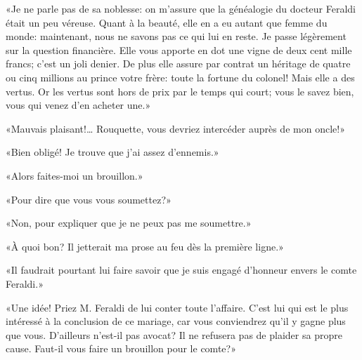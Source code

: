«Je ne parle pas de sa noblesse: on m'assure que la généalogie du docteur Feraldi était un peu véreuse. Quant à la beauté, elle en a eu autant que femme du monde: maintenant, nous ne savons pas ce qui lui en reste. Je passe légèrement sur la question financière. Elle vous apporte en dot une vigne de deux cent mille francs; c'est un joli denier. De plus elle assure par contrat un héritage de quatre ou cinq millions au prince votre frère: toute la fortune du colonel! Mais elle a des vertus. Or les vertus sont hors de prix par le temps qui court; vous le savez bien, vous qui venez d'en acheter une.»

«Mauvais plaisant!\ldots{} Rouquette, vous devriez intercéder auprès de mon oncle!»

«Bien obligé! Je trouve que j'ai assez d'ennemis.»

«Alors faites-moi un brouillon.»

«Pour dire que vous vous soumettez?»

«Non, pour expliquer que je ne peux pas me soumettre.»

«À quoi bon? Il jetterait ma prose au feu dès la première ligne.»

«Il faudrait pourtant lui faire savoir que je suis engagé d'honneur envers le comte Feraldi.»

«Une idée! Priez M. Feraldi de lui conter toute l'affaire. C'est lui qui est le plus intéressé à la conclusion de ce mariage, car vous conviendrez qu'il y gagne plus que vous. D'ailleurs n'est-il pas avocat? Il ne refusera pas de plaider sa propre cause. Faut-il vous faire un brouillon pour le comte?»

